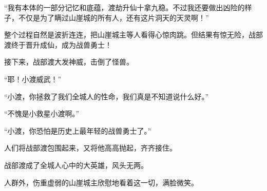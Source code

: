 \begin{this_body}
“我有本体的一部分记忆和底蕴，渡劫升仙十拿九稳。不过我还要做出凶险的样子，不仅是为了瞒过山崖城的所有人，还有这片洞天的天灵啊！”

整个过程自然是波折连连，把山崖城主等人看得心惊肉跳。但结果有惊无险，战部渡终于晋升成仙，成为战兽勇士！

接下来，战部渡大发神威，击倒了怪兽。

“耶！小渡威武！”

“小渡，你拯救了我们全城人的性命，我们真是不知道说什么好。”

“不愧是小救星小渡啊。”

“小渡，你恐怕是历史上最年轻的战兽勇士了。”

人们将战部渡包围起来，又将他高高抛起，齐齐接住。

战部渡成了全城人心中的大英雄，风头无两。

人群外，伤重虚弱的山崖城主欣慰地看着这一切，满脸微笑。

\end{this_body}

